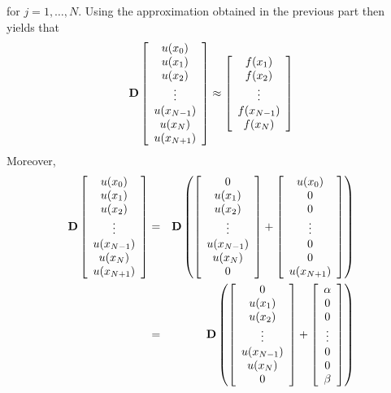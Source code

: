 \begin{solution}
\begin{enumerate}
\[\]
for $j=1,\ldots,N$. Using the approximation obtained in the previous part then yields that
\[
{\bf D}\left[\begin{array}{c} u(x_0) \\ u(x_1) \\u(x_2) \\ \vdots \\ u(x_{N-1}) \\ u(x_N) \\ u(x_{N+1}) \end{array}\right]\approx\left[\begin{array}{c} f(x_1) \\ f(x_2) \\ \vdots \\ f(x_{N-1}) \\ f(x_N) \end{array}\right]
\]
Moreover,
\begin{eqnarray*}
\BD\left[\begin{array}{c} u(x_0) \\ u(x_1) \\u(x_2) \\ \vdots \\ u(x_{N-1}) \\ u(x_N) \\ u(x_{N+1}) \end{array}\right]&=&\BD\left(\left[\begin{array}{c} 0 \\ u(x_1) \\u(x_2) \\ \vdots \\ u(x_{N-1}) \\ u(x_N) \\ 0 \end{array}\right]+\left[\begin{array}{c} u(x_0) \\ 0 \\ 0 \\ \vdots \\ 0 \\ 0 \\ u(x_{N+1}) \end{array}\right]\right)
\\
&=&\BD\left(\left[\begin{array}{c} 0 \\ u(x_1) \\u(x_2) \\ \vdots \\ u(x_{N-1}) \\ u(x_N) \\ 0 \end{array}\right]+\left[\begin{array}{c} \alpha \\ 0 \\ 0 \\ \vdots \\ 0 \\ 0 \\ \beta \end{array}\right]\right)

\end{eqnarray*}
\end{enumerate}
\end{solution}
